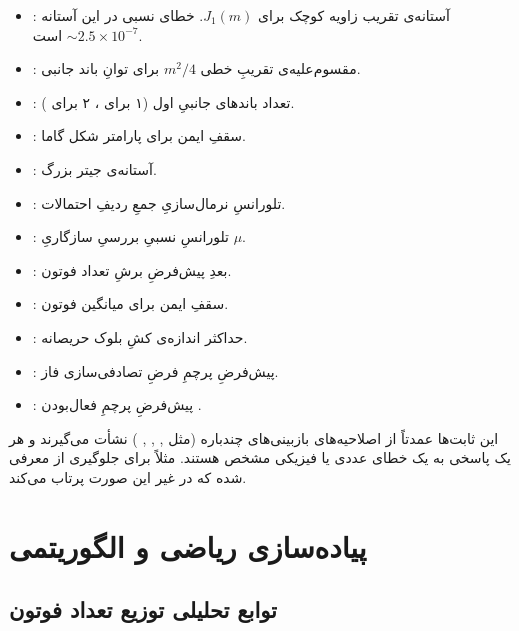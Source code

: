 \begin{itemize}
	\item {}: آستانه‌ی تقریب زاویه کوچک برای $J_1(m)$. خطای نسبی در این آستانه $\sim 2.5 \times 10^{-7}$ است.
	\item {}: مقسوم‌علیه‌ی تقریبِ خطی $m^2/4$ برای توانِ باند جانبی.
	\item {}: تعداد باندهای جانبیِ اول (۱ برای ، ۲ برای ).
	\item {}: سقفِ ایمن برای پارامتر شکل گاما.
	\item {}: آستانه‌ی جیتر بزرگ.
	\item {}: تلورانسِ نرمال‌سازیِ جمعِ ردیفِ احتمالات.
	\item {}: تلورانسِ نسبیِ بررسیِ سازگاریِ $\mu$.
	\item {}: بعدِ پیش‌فرضِ برشِ تعداد فوتون.
	\item {}: سقفِ ایمن برای میانگین فوتون.
	\item {}: حداکثر اندازه‌ی کشِ بلوک حریصانه.
	\item {}: پیش‌فرضِ پرچمِ فرضِ تصادفی‌سازی فاز.
	\item {}: پیش‌فرضِ پرچمِ فعال‌بودن .
\end{itemize}

این ثابت‌ها عمدتاً از اصلاحیه‌های بازبینی‌های چندباره (مثل , , , ) نشأت می‌گیرند و هر یک پاسخی به یک خطای عددی یا فیزیکی مشخص هستند. مثلاً  برای جلوگیری از  معرفی شده که در غیر این صورت  پرتاب می‌کند.

\section{پیاده‌سازی ریاضی و الگوریتمی}
\label{sec:sources-implementation}

\subsection{توابع تحلیلی توزیع تعداد فوتون}

